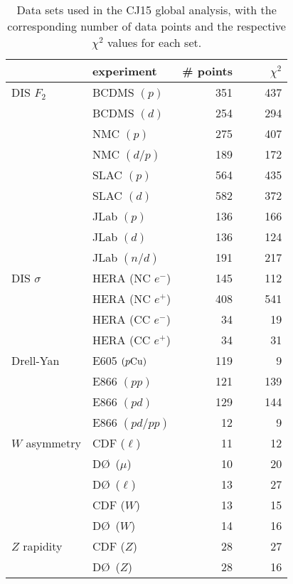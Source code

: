 \documentclass[aps,prd,amsmath,preprint]{revtex4}
\begin{document}
\begin{table}[tb]
\caption{Data sets used in the CJ15 global analysis, with the
	corresponding number of data points and the respective
	$\chi^2$ values for each set.\\}
\centering
{\scriptsize  
\begin{tabular}[c]{llrr}  \hline
  & experiment       			& \# points\!\!\!\!
					&\ \ \ \ $\chi^2$ \\ \hline
DIS $F_2$
  & BCDMS $(p)$ 	\cite{BCDMS}    & 351 & 437 \\
  & BCDMS $(d)$ 	\cite{BCDMS}    & 254 & 294 \\
  & NMC   $(p)$   	\cite{NMCp}     & 275 & 407 \\
  & NMC   $(d/p)$ 	\cite{NMCdop}   & 189 & 172 \\
  & SLAC  $(p)$  	\cite{SLAC}     & 564 & 435 \\
  & SLAC  $(d)$  	\cite{SLAC}     & 582 & 372 \\
  & JLab  $(p)$  	\cite{Malace}   & 136 & 166 \\
  & JLab  $(d)$  	\cite{Malace}   & 136 & 124 \\
  & JLab  $(n/d)$	\cite{BONuS}  	& 191 & 217 \\
DIS $\sigma$
  & HERA (NC $e^-$) 	\cite{HERA1}    & 145 & 112 \\
  & HERA (NC $e^+$) 	\cite{HERA1}    & 408 & 541 \\
  & HERA (CC $e^-$) 	\cite{HERA1}    &  34 &  19 \\
  & HERA (CC $e^+$) 	\cite{HERA1}    &  34 &  31 \\
Drell-Yan
  & E605 $(p{\rm Cu})$	\cite{E605}     & 119 &   9 \\
  & E866 $(pp)$		\cite{E866}     & 121 & 139 \\
  & E866 $(pd)$ 	\cite{E866}     & 129 & 144 \\
  & E866 $(pd/pp)$ 	\cite{E866rat}  &  12 &   9 \\
$W$ asymmetry
  & CDF  ($\ell$)	\cite{CDF05}    &  11 &  12 \\
  & D\O\ ($\mu$)  	\cite{D0_mu13}  &  10 &  20 \\  
  & D\O\ ($\ell$) 	\cite{D0_l15}   &  13 &  27 \\
  & CDF  ($W$)    	\cite{CDF09}    &  13 &  15 \\
  & D\O\ ($W$)    	\cite{D0_W}     &  14 &  16 \\
$Z$ rapidity
  & CDF  ($Z$)		\cite{CDFZ}     &  28 &  27 \\ 
  & D\O\ ($Z$)		\cite{D0Z}      &  28 &  16 \\

\end{tabular}}
\end{table}
\end{document}
